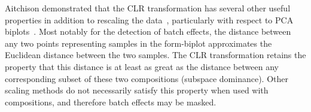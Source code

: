 \documentclass{article}\usepackage[]{graphicx}\usepackage[]{color}
\theoremstyle{definition}
\begin{document}
Aitchison demonstrated that the CLR transformation has several other useful properties in addition to rescaling the data~\cite{Aitchison1986}, particularly with respect to PCA biplots~\cite{Aitchison2002}.  Most notably for the detection of batch effects, the distance between any two points representing samples in the form-biplot approximates the Euclidean distance between the two samples.  The CLR transformation retains the property that this distance is at least as great as the distance between any corresponding subset of these two compositions (subspace dominance).  Other scaling methods do not necessarily satisfy this property when used with compositions, and therefore batch effects may be masked.\\






\newpage

\printbibliography
\end{document}
